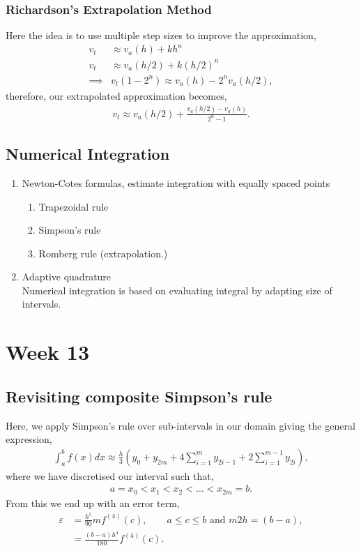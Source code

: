 \documentclass[11pt,a4paper]{report}
\begin{document}
			\subsubsection{Richardson's Extrapolation Method}
				Here the idea is to use multiple step sizes to improve the approximation,
				\begin{align}
					v_t&\approx v_a(h) + kh^n \\
					v_t&\approx v_a(h/2) + k (h/2)^n \\
					\implies &v_t(1-2^n) \approx v_a(h)-2^n v_a(h/2),
				\end{align}
				therefore, our extrapolated approximation becomes,
				\begin{align}
					v_t \approx v_a(h/2) + \frac{v_a (h/2) - v_a(h)}{2^n-1}.
				\end{align}
		\subsection{Numerical Integration}
		\begin{enumerate}
			\item Newton-Cotes formulas, estimate integration with equally spaced points
			\begin{enumerate}
				\item Trapezoidal rule
				\item Simpson's rule
				\item Romberg rule (extrapolation.)
			\end{enumerate}
			\item Adaptive quadrature \\
			Numerical integration is based on evaluating integral by adapting size of intervals. 
		\end{enumerate}
	
	\section{Week 13}
	\subsection{Revisiting composite Simpson's rule}
	Here, we apply Simpson's rule over sub-intervals in our domain giving the general expression,
	\begin{align}
		\int_a^b f(x) dx \approx \frac{h}{3} \left( y_0 + y_{2m} + 4\sum_{i=1}^m y_{2i-1} + 2\sum_{i=1}^{m-1} y_{2i} \right),
	\end{align}
	where we have discretised our interval such that,
	\begin{align}
		a = x_0 < x_1 < x_2<\dots < x_{2m} = b.
	\end{align}
	From this we end up with an error term,
	\begin{align}
		\varepsilon &= \frac{h^5}{90} mf^{(4)} (c), \qquad a\leq c\leq b \text{ and } m2h=(b-a),\\
		&= \frac{(b-a)h^4}{180}f^{(4)} (c).
	\end{align}
	
\end{document}
